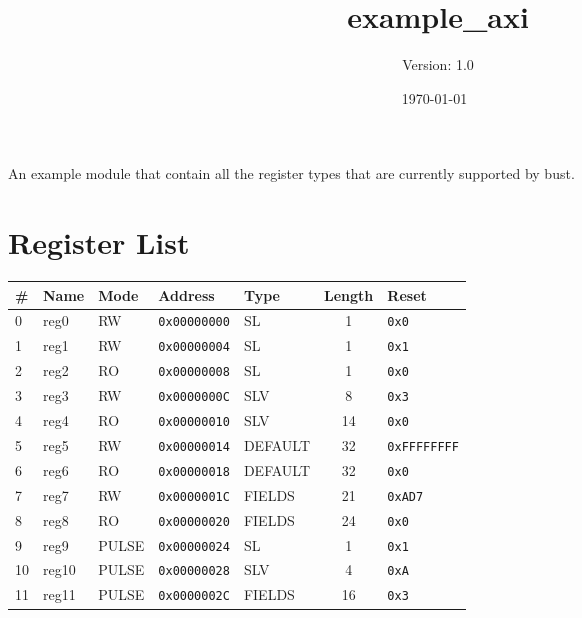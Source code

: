 \documentclass{article}
\title{example{\_}axi}
\author{Version: 1.0}
\date{\today\ \currenttime}
\begin{document}
\maketitle
\thispagestyle{fancy}

An example module that contain all the register types that are currently supported by bust.

\section{Register List}

\begin{table}[h!]
  \begin{center}
    \label{tab:table1}
    \begin{tabularx}{\linewidth}{|l|X|l|l|l|c|l|}
      \hline
      \textbf{\#} & \textbf{Name} & \textbf{Mode} & \textbf{Address} & \textbf{Type} & \textbf{Length} &
      \textbf{Reset} \\
      \hline
      0 & reg0 & RW & \texttt{0x00000000} & SL & 1 & \texttt{0x0} \\
      \hline
      1 & reg1 & RW & \texttt{0x00000004} & SL & 1 & \texttt{0x1} \\
      \hline
      2 & reg2 & RO & \texttt{0x00000008} & SL & 1 & \texttt{0x0} \\
      \hline
      3 & reg3 & RW & \texttt{0x0000000C} & SLV & 8 & \texttt{0x3} \\
      \hline
      4 & reg4 & RO & \texttt{0x00000010} & SLV & 14 & \texttt{0x0} \\
      \hline
      5 & reg5 & RW & \texttt{0x00000014} & DEFAULT & 32 & \texttt{0xFFFFFFFF} \\
      \hline
      6 & reg6 & RO & \texttt{0x00000018} & DEFAULT & 32 & \texttt{0x0} \\
      \hline
      7 & reg7 & RW & \texttt{0x0000001C} & FIELDS & 21 & \texttt{0xAD7} \\
      \hline
      8 & reg8 & RO & \texttt{0x00000020} & FIELDS & 24 & \texttt{0x0} \\
      \hline
      9 & reg9 & PULSE & \texttt{0x00000024} & SL & 1 & \texttt{0x1} \\
      \hline
      10 & reg10 & PULSE & \texttt{0x00000028} & SLV & 4 & \texttt{0xA} \\
      \hline
      11 & reg11 & PULSE & \texttt{0x0000002C} & FIELDS & 16 & \texttt{0x3} \\
      \hline
    \end{tabularx}
  \end{center}
\end{table}
\end{document}
